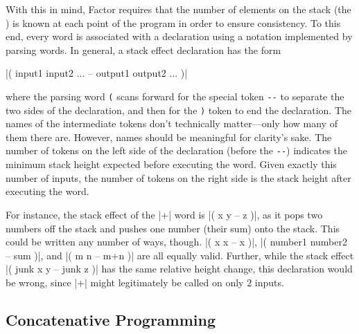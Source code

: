With this in mind, Factor requires that the number of elements on the stack
(the ) is known at each point of the program in order to
ensure consistency.  To this end, every word is associated with a  declaration using a notation implemented by parsing words.  In general,
a stack effect declaration has the form
%
\begin{center} \factor|( input1 input2 ... -- output1 output2 ... )|
\end{center}
%
where the parsing word \Verb|(| scans forward for the special token \Verb|--|
to separate the two sides of the declaration, and then for the \Verb|)| token
to end the declaration.  The names of the intermediate tokens don't technically
matter---only how many of them there are.  However, names should be meaningful
for clarity's sake.  The number of tokens on the left side of the declaration
(before the \Verb|--|) indicates the minimum stack height expected before
executing the word.  Given exactly this number of inputs, the number of tokens
on the right side is the stack height after executing the word.

For instance, the stack effect of the \factor|+| word is
%
\factor|( x y -- z )|,
%
as it pops two numbers off the stack and pushes one number (their sum) onto the
stack.  This could be written any number of ways, though.
%
\factor|( x x -- x )|,
%
\factor|( number1 number2 -- sum )|,
%
and
%
\factor|( m n -- m+n )|
%
are all equally valid.  Further, while the stack effect
%
\factor|( junk x y -- junk z )|
%
has the same relative height change, this declaration would be wrong, since
\factor|+| might legitimately be called on only $2$ inputs.


\subsection{Concatenative Programming}

